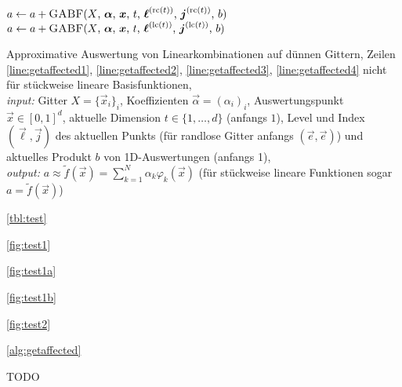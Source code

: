 \begin{algorithm}
\begin{algorithmic}[1]
    \EndIf
    \label{line:getaffected4}
    \color{black}
    \EndIf\vspace{-0.25em}
    $a \gets a + \text{\Call{GABF}{$X$, $\vec{\alpha}$, $\vec{x}$, $t$,
        $\vec{\ell}^{\text{(rc($t$))}}$, $\vec{j}^{\text{(rc($t$))}}$, $b$}}$
    \label{line:getaffected6}
    \Else{}
    $a \gets a + \text{\Call{GABF}{$X$, $\vec{\alpha}$, $\vec{x}$, $t$,
        $\vec{\ell}^{\text{(lc($t$))}}$, $\vec{j}^{\text{(lc($t$))}}$, $b$}}$
    \EndIf\vspace{-0.15em}
    \label{line:getaffected7}
    \EndFunction
  \end{algorithmic}
  \caption{Approximative Auswertung von Linearkombinationen auf dünnen Gittern,
    Zeilen \ref*{line:getaffected1}, \ref*{line:getaffected2},
    \ref*{line:getaffected3}, \ref*{line:getaffected4} nicht für
    stückweise lineare Basisfunktionen,\\
    \emph{input:}
    Gitter $X = \{\vec{x}_i\}_i$,
    Koeffizienten $\vec{\alpha} = (\alpha_i)_i$,
    Auswertungspunkt $\vec{x} \in [0, 1]^d$,
    aktuelle Dimension $t \in \{1, \dotsc, d\}$ (anfangs $1$),
    Level und Index $(\vec{\ell}, \vec{j})$ des aktuellen Punkts
    (für randlose Gitter anfangs $(\vec{e}, \vec{e})$) und
    aktuelles Produkt $b$ von 1D-Auswertungen (anfangs 1),\\
    \emph{output:}
    $a \approx \widetilde{f}(\vec{x}) = \sum_{k=1}^N \alpha_k \varphi_k(\vec{x})$
    (für stückweise lineare Funktionen sogar $a = \widetilde{f}(\vec{x})$)}%
  \label{alg:getaffected}
\end{algorithm}

\cref{tbl:test}

\cref{fig:test1}

\cref{fig:test1a}

\cref{fig:test1b}

\cref{fig:test2}

\cref{alg:getaffected}

\begin{theorem}
  \blindtext
\end{theorem}

\begin{lemma}
  TODO
\end{lemma}

\blindtext

\begin{definition}%
  \blindtext
\end{definition}

\blindmathpaper
